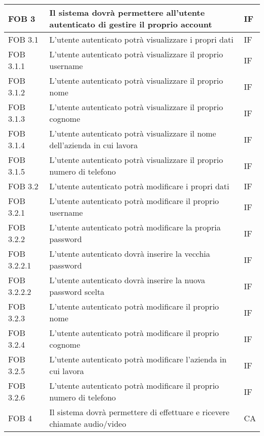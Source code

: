 \begin{longtable}{p{} p{} p{} }
\midrule
FOB 3 & Il sistema dovrà permettere all'utente autenticato di gestire il proprio account & IF\\
\midrule

FOB 3.1 & L'utente autenticato potrà visualizzare i propri dati & IF\\
\midrule
FOB 3.1.1 & L'utente autenticato potrà visualizzare il proprio username & IF\\
\midrule
FOB 3.1.2 & L'utente autenticato potrà visualizzare il proprio nome & IF\\
\midrule
FOB 3.1.3 & L'utente autenticato potrà visualizzare il proprio cognome & IF\\
\midrule
FOB 3.1.4 & L'utente autenticato potrà visualizzare il nome dell'azienda in cui lavora & IF\\
\midrule
FOB 3.1.5 & L'utente autenticato potrà visualizzare il proprio numero di telefono & IF\\

\midrule
FOB 3.2 & L'utente autenticato potrà modificare i propri dati & IF\\

\midrule
FOB 3.2.1 & L'utente autenticato potrà modificare il proprio username & IF\\

\midrule
FOB 3.2.2 & L'utente autenticato potrà modificare la propria password & IF\\
\midrule
FOB 3.2.2.1 & L'utente autenticato dovrà inserire la vecchia password & IF\\
\midrule
FOB 3.2.2.2 & L'utente autenticato dovrà inserire la nuova password scelta & IF\\

\midrule
FOB 3.2.3 & L'utente autenticato potrà modificare il proprio nome & IF\\

\midrule
FOB 3.2.4 & L'utente autenticato potrà modificare il proprio cognome & IF\\

\midrule
FOB 3.2.5 & L'utente autenticato potrà modificare l'azienda in cui lavora & IF\\

\midrule
FOB 3.2.6 & L'utente autenticato potrà modificare il proprio numero di telefono & IF\\

\midrule
FOB 4 & Il sistema dovrà permettere di effettuare e ricevere chiamate audio/video & CA\\


\end{longtable}
